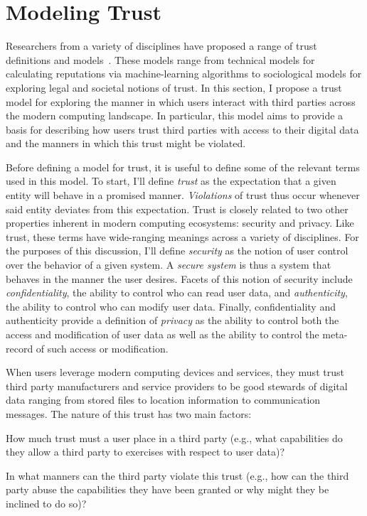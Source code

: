 \section{Modeling Trust}
\label{sec:model}

Researchers from a variety of disciplines have proposed a range of
trust definitions and models~\cite{camp2003, flowerday2006,
  grandison2000, sabater2005}. These models range from technical
models for calculating reputations via machine-learning algorithms to
sociological models for exploring legal and societal notions of
trust. In this section, I propose a trust model for exploring the
manner in which users interact with third parties across the modern
computing landscape. In particular, this model aims to provide a basis
for describing how users trust third parties with access to their
digital data and the manners in which this trust might be violated.

Before defining a model for trust, it is useful to define some of the
relevant terms used in this model. To start, I'll define
\textit{trust} as the expectation that a given entity will behave in a
promised manner. \textit{Violations} of trust thus occur whenever said
entity deviates from this expectation. Trust is closely related to two
other properties inherent in modern computing ecosystems: security and
privacy. Like trust, these terms have wide-ranging meanings across a
variety of disciplines. For the purposes of this discussion, I'll
define \textit{security} as the notion of user control over the
behavior of a given system. A \textit{secure system} is thus a system
that behaves in the manner the user desires. Facets of this notion of
security include \textit{confidentiality}, the ability to control who
can read user data, and \textit{authenticity}, the ability to control
who can modify user data. Finally, confidentiality and authenticity
provide a definition of \textit{privacy} as the ability to control
both the access and modification of user data as well as the ability
to control the meta-record of such access or modification.

When users leverage modern computing devices and services, they must
trust third party manufacturers and service providers to be good
stewards of digital data ranging from stored files to location
information to communication messages. The nature of this trust has
two main factors:

\begin{packed_desc}
\item[Degree:] How much trust must a user place in a third party
  (e.g., what capabilities do they allow a third party to exercises with
  respect to user data)?
\item[Violation:] In what manners can the third party violate this
  trust (e.g., how can the third party abuse the capabilities they have
  been granted or why might they be inclined to do so)?
\end{packed_desc}

